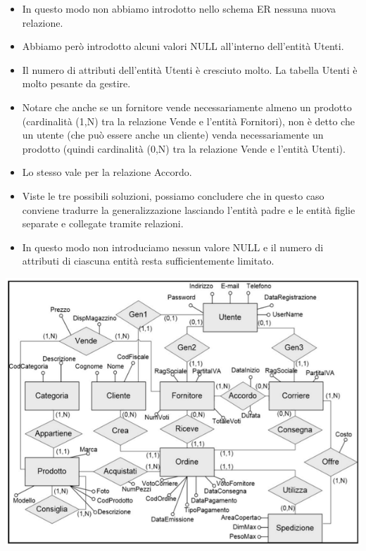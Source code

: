 \begin{itemize}
	\item In questo modo non abbiamo introdotto nello schema ER
	nessuna nuova relazione. 
	\item Abbiamo però introdotto alcuni valori NULL all’interno dell’entità Utenti. 
	\item Il numero di attributi dell’entità Utenti è cresciuto
	molto. La tabella Utenti è molto pesante da gestire.
	\item Notare che anche se un fornitore vende
	necessariamente almeno un prodotto (cardinalità (1,N) tra la relazione Vende e l’entità Fornitori), non è detto
	che un utente (che può essere anche un cliente) venda necessariamente un prodotto (quindi cardinalità (0,N) tra la relazione Vende e l’entità Utenti). 
	\item Lo stesso vale per la relazione Accordo.\\
	
	\item Viste le tre possibili soluzioni, possiamo concludere che
	in questo caso conviene tradurre la generalizzazione
	lasciando l’entità padre e le entità figlie separate e
	collegate tramite relazioni. 
	\item In questo modo non introduciamo nessun valore NULL e
	il numero di attributi di ciascuna entità resta
	sufficientemente limitato. 
\end{itemize}
\begin{center}
	\includegraphics{images/94.PNG}
\end{center}
